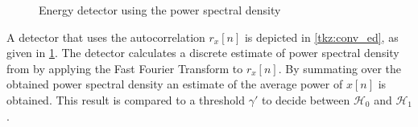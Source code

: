 \documentclass[a4paper, openany, oneside]{memoir}
\begin{document}
\begin{figure}[H]
\centering
{}
\caption{Energy detector using the power spectral density}
\label{tkz:ed_psd}
\end{figure}

A detector that uses the autocorrelation $r_x[n]$ is depicted in \cref{tkz:conv_ed}, as given in \cref{tkz:ed_psd}. The detector calculates a discrete estimate of power spectral density from by applying the Fast Fourier Transform to $r_x[n]$. By summating over the obtained power spectral density an estimate of the average power of $x[n]$ is obtained. This result is compared to a threshold $\gamma'$  to decide between $\mathcal{H}_0$ and $\mathcal{H}_1$. 
\end{document}
